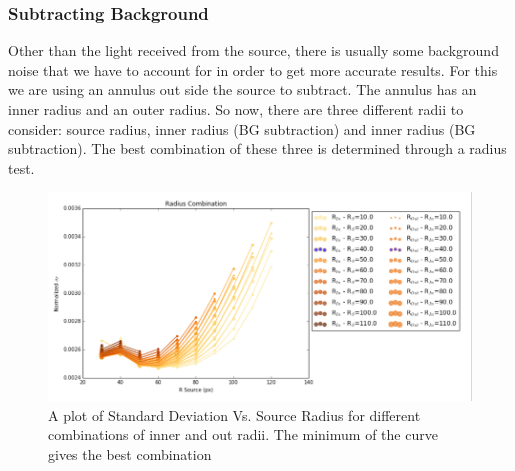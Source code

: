 \documentclass[conference]{IEEEtran}
\begin{document}
\subsubsection{Subtracting Background}
Other than the light received from the source, there is usually some background noise that we have to account for in order to get more accurate results. For this we are using an annulus out side the source to subtract. The annulus has an inner radius and an outer radius. So now, there are three different radii to consider: source radius, inner radius (BG subtraction) and inner radius (BG subtraction). The best combination of these three is determined through a radius test. 
\begin{figure}[H]
\includegraphics[scale=0.45]{Combo}
\caption{A plot of Standard Deviation Vs. Source Radius for different combinations of inner and out radii. The minimum of the curve gives the best combination}
\end{figure}
\end{document}

